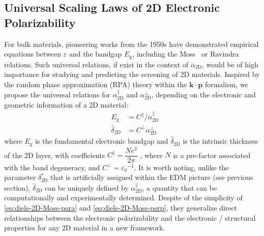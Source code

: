 

\subsection{Universal Scaling Laws of 2D Electronic Polarizability}
\label{sec:diel-univ-scal-laws}

For bulk materials, pioneering works from the 1950s have demonstrated
empirical equations between $\varepsilon$ and the bandgap
$E_{\mathrm{g}}$, including the
Moss~\cite{Moss_1950_relation,Moss_1985_n_Eg,Finkenrath_1988_moss1} or
Ravindra~\cite{Ravindra_1980_model,Ravindra_1979_eps_Eg} relations.
Such universal relations, if exist in the context of
$\alpha_{\mathrm{2D}}$, would be of high importance for studying and
predicting the screening of 2D materials.  Inspired by the random
phase approximation (RPA) theory \cite{Adler_1962_eps} within the
$\mathbf{k} \cdot \mathbf{p}$
formalism\cite{Kittel_2005_introduction_book,Jiang_2017_Eg_Eb}, we propose
the universal relations for $\alpha_{\mathrm{2D}}^{\parallel}$ and
$\alpha_{\mathrm{2D}}^{\perp}$, depending on the electronic and
geometric information of a 2D material:
\begin{subequations}
\begin{eqnarray}
\label{eq:diele-2D-Moss-para}
  &E_{\mathrm{g}} &= C^{\parallel} / \alpha_{\mathrm{2D}}^{\parallel} \\
  \label{eq:diele-2D-Moss-perp}
  &\hat{\delta}_{\mathrm{2D}} & = C^{\perp} \alpha_{\mathrm{2D}}^{\perp} 
\end{eqnarray}
\end{subequations}
where $E_{\mathrm{g}}$ is the fundamental electronic bandgap and
$\hat{\delta}_{\mathrm{2D}}$ is the intrinsic thickness of the 2D
layer, with coefficients
$C^{\parallel} = \dfrac{Ne^2}{2 \pi}$
\cite{Jiang_2017_Eg_Eb}, where $N$ is a pre-factor associated with the
band degeneracy, and $C^{\perp} = {\varepsilon_{0}}^{-1}$. It is worth
noting, unlike the parameter $\delta^{*}_{\mathrm{2D}}$ that is
artificially assigned within the EDM picture (see previous section),
$\hat{\delta}_{\mathrm{2D}}$ can be uniquely defined by
$\alpha_{\mathrm{2D}}^{\parallel}$, a quantity that can be
computationally and experimentally determined. Despite of the
simplicity of  \autoref{eq:diele-2D-Moss-para} and \autoref{eq:diele-2D-Moss-perp},
they generalize direct relationships between the electronic polarizability and
the electronic / structural properties for any 2D material in a new
framework.

